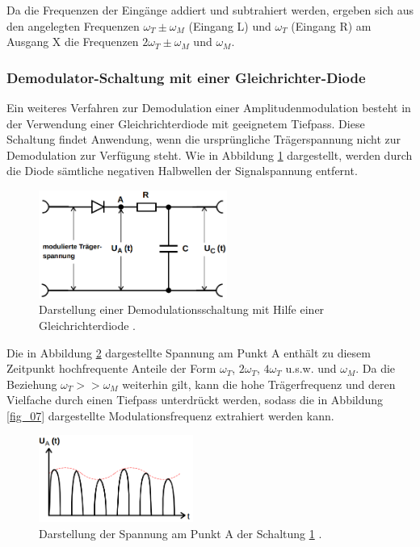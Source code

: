 Da die Frequenzen der Eingänge addiert und subtrahiert werden, ergeben sich aus den angelegten Frequenzen $\omega_T\pm\omega_M$ (Eingang L) und $\omega_T$ (Eingang R) am Ausgang X die Frequenzen $2\omega_T\pm\omega_M$ und $\omega_M$.

\subsubsection{Demodulator-Schaltung mit einer Gleichrichter-Diode}
\label{DSmeGD}
Ein weiteres Verfahren zur Demodulation einer Amplitudenmodulation besteht in der Verwendung einer Gleichrichterdiode mit geeignetem Tiefpass. Diese Schaltung findet Anwendung, wenn die ursprüngliche Trägerspannung nicht zur Demodulation zur Verfügung steht. Wie in Abbildung \ref{fig_05} dargestellt, werden durch die Diode sämtliche negativen Halbwellen der Signalspannung entfernt.

\begin{figure}
    \centering
    \includegraphics[width=0.55\textwidth]{ressources/A5.png}
    \caption{Darstellung einer Demodulationsschaltung mit Hilfe einer Gleichrichterdiode \cite{skript}.}
    \label{fig_05}
\end{figure}

Die in Abbildung \ref{fig_06} dargestellte Spannung am Punkt A enthält zu diesem Zeitpunkt hochfrequente Anteile der Form $\omega_T$, $2\omega_T$, $4\omega_T$ u.s.w. und $\omega_M$. Da die Beziehung $\omega_T>>\omega_M$ weiterhin gilt, kann die hohe Trägerfrequenz und deren Vielfache durch einen Tiefpass unterdrückt werden, sodass die in Abbildung \ref{fig_07} dargestellte Modulationsfrequenz extrahiert werden kann. 

\begin{figure}
    \centering
    \includegraphics[width=0.45\textwidth]{ressources/A6.png}
    \caption{Darstellung der Spannung am Punkt A der Schaltung \ref{fig_05} \cite{skript}.}
    \label{fig_06}
\end{figure}

